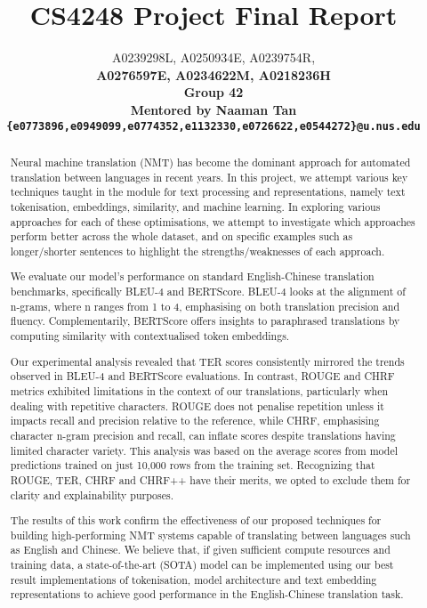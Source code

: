 \documentclass[11pt]{article}
\title{CS4248 Project Final Report}
\author{A0239298L, A0250934E, A0239754R, \\ \bf A0276597E, A0234622M, A0218236H \\
  Group 42 \\
  Mentored by Naaman Tan \\
  \texttt{\{e0773896,e0949099,e0774352,e1132330,e0726622,e0544272\}@u.nus.edu}}
\begin{document}
\maketitle
\begin{abstract}

Neural machine translation (NMT) has become the dominant approach for automated translation between languages in recent years. In this project, we attempt various key techniques taught in the module for text processing and representations, namely text tokenisation, embeddings, similarity, and machine learning. In exploring various approaches for each of these optimisations, we attempt to investigate which approaches perform better across the whole dataset, and on specific examples such as longer/shorter sentences to highlight the strengths/weaknesses of each approach.

We evaluate our model’s performance on standard English-Chinese translation benchmarks, specifically BLEU-4 and BERTScore. BLEU-4 looks at the alignment of n-grams, where n ranges from 1 to 4, emphasising on both translation precision and fluency. Complementarily, BERTScore offers insights to paraphrased translations by computing similarity with contextualised token embeddings. 

Our experimental analysis revealed that TER scores consistently mirrored the trends observed in BLEU-4 and BERTScore evaluations. In contrast, ROUGE and CHRF metrics exhibited limitations in the context of our translations, particularly when dealing with repetitive characters. ROUGE does not penalise repetition unless it impacts recall and precision relative to the reference, while CHRF, emphasising character n-gram precision and recall, can inflate scores despite translations having limited character variety. This analysis was based on the average scores from model predictions trained on just 10,000 rows from the training set. Recognizing that ROUGE, TER, CHRF and CHRF++ have their merits, we opted to exclude them for clarity and explainability purposes. 

The results of this work confirm the effectiveness of our proposed techniques for building high-performing NMT systems capable of translating between languages such as English and Chinese. We believe that, if given sufficient compute resources and training data, a state-of-the-art (SOTA) model can be implemented using our best result implementations of tokenisation, model architecture and text embedding representations to achieve good performance in the English-Chinese translation task.
    
\end{abstract}
\end{document}
